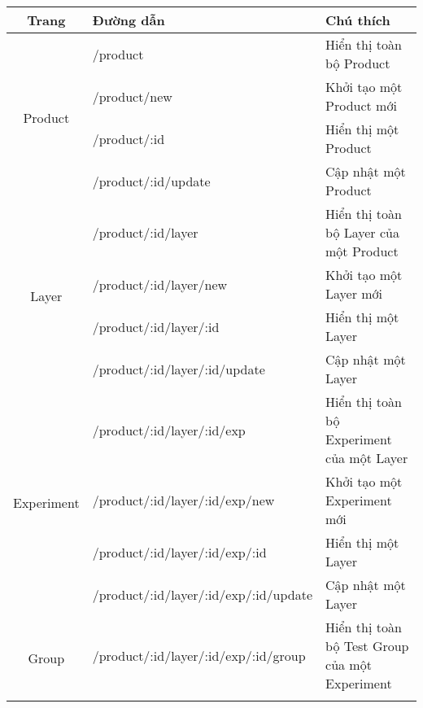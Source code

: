 \begin{table}[H]
	\centering
	\begin{tabular}{|c|l|p{5cm}|}
		\hline
		Trang                       & Đường dẫn                                       & Chú thích                                      \\ \hline
		\multirow{4}{*}{Product}    & /product                                        & Hiển thị toàn bộ Product                       \\ \cline{2-3}
		                            & /product/new                                    & Khởi tạo một Product mới                       \\ \cline{2-3}
		                            & /product/:id                                    & Hiển thị một Product                           \\ \cline{2-3}
		                            & /product/:id/update                             & Cập nhật một Product                           \\ \hline
		\multirow{4}{*}{Layer}      & /product/:id/layer                              & Hiển thị toàn bộ Layer của một Product         \\ \cline{2-3}
		                            & /product/:id/layer/new                          & Khởi tạo một Layer mới                         \\ \cline{2-3}
		                            & /product/:id/layer/:id                          & Hiển thị một Layer                             \\ \cline{2-3}
		                            & /product/:id/layer/:id/update                   & Cập nhật một Layer                             \\ \hline
		\multirow{4}{*}{Experiment} & /product/:id/layer/:id/exp                      & Hiển thị toàn bộ Experiment của một Layer      \\ \cline{2-3}
		                            & /product/:id/layer/:id/exp/new                  & Khởi tạo một Experiment mới                    \\ \cline{2-3}
		                            & /product/:id/layer/:id/exp/:id                  & Hiển thị một Layer                             \\ \cline{2-3}
		                            & /product/:id/layer/:id/exp/:id/update           & Cập nhật một Layer                             \\ \hline
		\multirow{4}{*}{Group}      & /product/:id/layer/:id/exp/:id/group            & Hiển thị toàn bộ Test Group của một Experiment \\ \cline{2-3}

\end{tabular}
\end{table}
